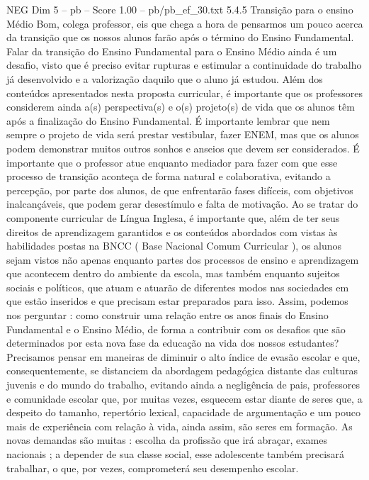 \begin{textsample}{NEG Dim 5 – pb – Score 1.00 – pb/pb\_ef\_30.txt}  \label{ex:f5_neg_198}
5.4.5 Transição para o ensino Médio Bom, colega professor, eis que chega a hora de pensarmos um pouco acerca da transição que os nossos alunos farão após o término do Ensino Fundamental.
Falar da transição do Ensino Fundamental para o Ensino Médio ainda é um desafio, visto que é preciso evitar rupturas e estimular a continuidade do trabalho já desenvolvido e a valorização daquilo que o aluno já estudou.
Além dos conteúdos apresentados nesta proposta curricular, é importante que os professores considerem ainda a(s) perspectiva(s) e o(s) projeto(s) de vida que os alunos têm após a finalização do Ensino Fundamental.
É importante lembrar que nem sempre o projeto de vida será prestar vestibular, fazer ENEM, mas que os alunos podem demonstrar muitos outros sonhos e anseios que devem ser considerados.
É importante que o professor atue enquanto mediador para fazer com que esse processo de transição aconteça de forma natural e colaborativa, evitando a percepção, por parte dos alunos, de que enfrentarão fases difíceis, com objetivos inalcançáveis, que podem gerar desestímulo e falta de motivação.
Ao se tratar do componente curricular de Língua Inglesa, é importante que, além de ter seus direitos de aprendizagem garantidos e os conteúdos abordados com vistas às habilidades postas na BNCC ( Base Nacional Comum Curricular ), os alunos sejam vistos não apenas enquanto partes dos processos de ensino e aprendizagem que acontecem dentro do ambiente da escola, mas também enquanto sujeitos sociais e políticos, que atuam e atuarão de diferentes modos nas sociedades em que estão inseridos e que precisam estar preparados para isso.
Assim, podemos nos perguntar : como construir uma relação entre os anos finais do Ensino Fundamental e o Ensino Médio, de forma a contribuir com os desafios que são determinados por esta nova fase da educação na vida dos nossos estudantes?
Precisamos pensar em maneiras de diminuir o alto índice de evasão escolar e que, consequentemente, se distanciem da abordagem pedagógica distante das culturas juvenis e do mundo do trabalho, evitando ainda a negligência de pais, professores e comunidade escolar que, por muitas vezes, esquecem estar diante de seres que, a despeito do tamanho, repertório lexical, capacidade de argumentação e um pouco mais de experiência com relação à vida, ainda assim, são seres em formação.
As novas demandas são muitas : escolha da profissão que irá abraçar, exames nacionais ; a depender de sua classe social, esse adolescente também precisará trabalhar, o que, por vezes, comprometerá seu desempenho escolar.

\end{textsample}
